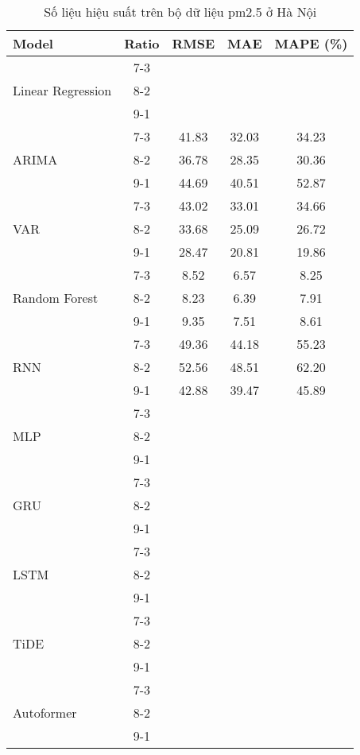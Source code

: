 \begin{table}[h!]
    \centering
    \caption{Số liệu hiệu suất trên bộ dữ liệu pm2.5 ở Hà Nội}
    \begin{tabular}{|l|c|c|c|c|}
    \hline
    \rowcolor{orange!30} \textbf{Model} & \textbf{Ratio} & \textbf{RMSE} & \textbf{MAE} & \textbf{MAPE (\%)} \\ \hline
    \rowcolor{white} & 7-3 &  &  &  \\ 
    \rowcolor{white} Linear Regression & 8-2 &  &  &  \\ 
    \rowcolor{white} & 9-1 &  &  &  \\ \hline
    \rowcolor{white}  & 7-3 & 41.83 & 32.03 & 34.23 \\ 
    \rowcolor{white} ARIMA & 8-2 & 36.78 & 28.35 & 30.36 \\ 
    \rowcolor{white}  & 9-1 & 44.69 & 40.51 & 52.87 \\ \hline
    \rowcolor{white}  & 7-3 & 43.02 & 33.01 & 34.66 \\ 
    \rowcolor{white} VAR & 8-2 & 33.68 & 25.09 & 26.72 \\ 
    \rowcolor{white}  & 9-1 & 28.47 & 20.81 & 19.86 \\ \hline
    \rowcolor{white} & 7-3 & 8.52 & 6.57 & 8.25 \\ 
    \rowcolor{white} Random Forest & 8-2 & 8.23 & 6.39 & 7.91 \\ 
    \rowcolor{white} & 9-1 & 9.35 & 7.51 & 8.61 \\ \hline
    \rowcolor{white}  & 7-3 & 49.36 & 44.18 & 55.23 \\ 
    \rowcolor{white} RNN & 8-2 & 52.56 & 48.51 & 62.20 \\
    \rowcolor{white}  & 9-1 & 42.88 & 39.47 & 45.89 \\ \hline
    \rowcolor{white} & 7-3 &  &  &  \\ 
    \rowcolor{white} MLP & 8-2 &  &  &  \\ 
    \rowcolor{white} & 9-1 &  &  &  \\ \hline
    \rowcolor{white} & 7-3 &  &  &  \\ 
    \rowcolor{white} GRU & 8-2 &  &  &  \\ 
    \rowcolor{white} & 9-1 &  &  &  \\ \hline
    \rowcolor{white} & 7-3 &  &  &  \\ 
    \rowcolor{white} LSTM & 8-2 &  &  &  \\ 
    \rowcolor{white} & 9-1 &  &  &  \\ \hline
    \rowcolor{white!30} & 7-3 &  &  &  \\ 
    \rowcolor{white!30} TiDE & 8-2 &  &  &  \\ 
    \rowcolor{white!30} & 9-1 &  &  &  \\ \hline
    \rowcolor{white} & 7-3 &  &  &  \\ 
    \rowcolor{white} Autoformer & 8-2 &  &  &  \\ 
    \rowcolor{white} & 9-1 &  &  &  \\ \hline

    \end{tabular}
\end{table}